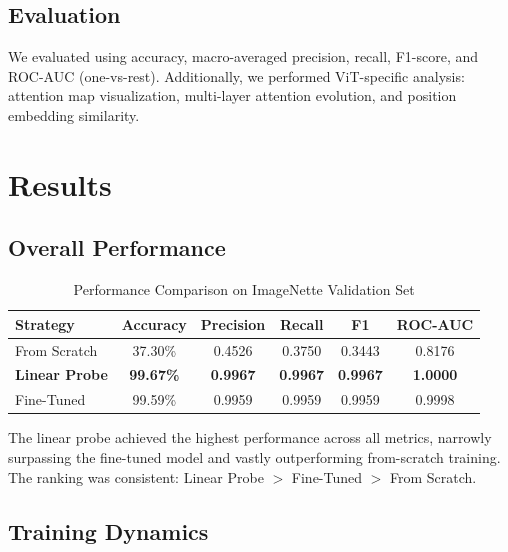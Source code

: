 \documentclass[12pt]{article}
\begin{document}
\subsection{Evaluation}

We evaluated using accuracy, macro-averaged precision, recall, F1-score, and ROC-AUC (one-vs-rest). Additionally, we performed ViT-specific analysis: attention map visualization, multi-layer attention evolution, and position embedding similarity.

\section{Results}

\subsection{Overall Performance}

\begin{table}[H]
\centering
\caption{Performance Comparison on ImageNette Validation Set}
\label{tab:results}
\begin{tabular}{lccccc}
\toprule
\textbf{Strategy} & \textbf{Accuracy} & \textbf{Precision} & \textbf{Recall} & \textbf{F1} & \textbf{ROC-AUC} \\
\midrule
From Scratch & 37.30\% & 0.4526 & 0.3750 & 0.3443 & 0.8176 \\
\textbf{Linear Probe} & \textbf{99.67\%} & \textbf{0.9967} & \textbf{0.9967} & \textbf{0.9967} & \textbf{1.0000} \\
Fine-Tuned & 99.59\% & 0.9959 & 0.9959 & 0.9959 & 0.9998 \\
\bottomrule
\end{tabular}
\end{table}

The linear probe achieved the highest performance across all metrics, narrowly surpassing the fine-tuned model and vastly outperforming from-scratch training. The ranking was consistent: Linear Probe $>$ Fine-Tuned $>$ From Scratch.

\subsection{Training Dynamics}

\end{document}
